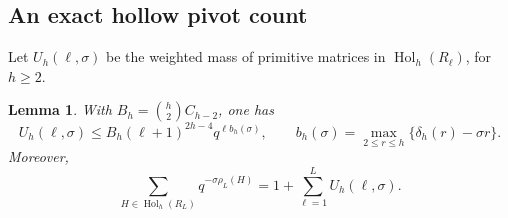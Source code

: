 \documentclass[11pt]{article}
\numberwithin{equation}{section}
\newtheorem{lemma}[theorem]{Lemma}
\theoremstyle{remark}
\newcommand{\Hol}{\operatorname{Hol}}
\begin{document}
\subsection{An exact hollow pivot count}
Let $U_h(\ell,\sigma )$ be the weighted mass of primitive matrices in
$\Hol_h(R_\ell)$, for $h\ge2$.

\begin{lemma}\label{lem:hollow}
With $B_h=\binom h2 C_{h-2}$, one has
\begin{equation}\label{eq:hollow}
 U_h(\ell,\sigma )\le B_h(\ell+1)^{2h-4}q^{\ell b_h(\sigma )},\qquad
 b_h(\sigma )=\max_{2\le r\le h}\{\delta_h(r)-\sigma r\}.
\end{equation}
Moreover,
\begin{equation}\label{eq:fullhollow}
 \sum_{H\in\Hol_h(R_L)}q^{-\sigma \rho_L(H)}
     =1+\sum_{\ell=1}^L U_h(\ell,\sigma ).
\end{equation}
\end{lemma}
\end{document}
